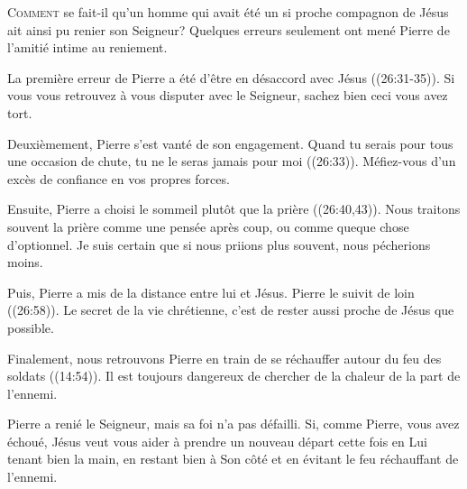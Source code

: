 \lettrine{C}{omment} se fait-il qu'un homme qui avait été un si proche
 compagnon de Jésus ait ainsi pu renier son Seigneur?
 Quelques erreurs seulement ont mené Pierre de l'amitié intime au reniement. 

La première erreur de Pierre a été d'être en désaccord avec Jésus
 ((26:31-35)).
 Si vous vous retrouvez à vous disputer avec le Seigneur,
 sachez bien ceci\frcolon{} vous avez tort. 


Deuxièmement, Pierre s'est vanté de son engagement.
 \Og Quand tu serais pour tous une occasion de chute,
 tu ne le seras jamais pour moi \Fg{} ((26:33)).
 Méfiez-vous d'un excès de confiance en vos propres forces. 

Ensuite, Pierre a choisi le sommeil plutôt que la prière
 ((26:40,43)).
 Nous traitons souvent la prière comme une pensée après coup,
 ou comme queque chose d'optionnel.
 Je suis certain que si nous priions plus souvent, nous pécherions moins. 

Puis, Pierre a mis de la distance entre lui et Jésus.
 \Og Pierre le suivit de loin \Fg{} ((26:58)).
 Le secret de la vie chrétienne, 
 c'est de rester aussi proche de Jésus que possible. 

Finalement, nous retrouvons Pierre en train de se réchauffer
 autour du feu des soldats ((14:54)).
 Il est toujours dangereux de chercher de la chaleur de la part de l'ennemi. 

Pierre a renié le Seigneur, mais sa foi n'a pas défailli.
 Si, comme Pierre, vous avez échoué, Jésus veut vous aider
 à prendre un nouveau départ \ocadr cette fois en Lui tenant bien la main,
 en restant bien à Son côté et en évitant le feu réchauffant de l'ennemi. 

\dvrule






